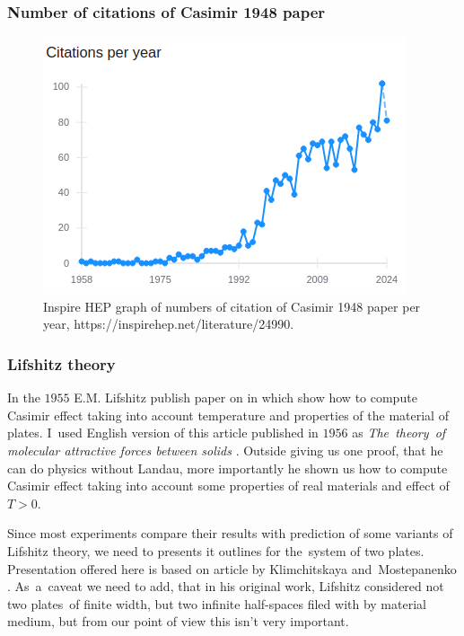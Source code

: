 \documentclass[10pt,t]{beamer}
\begin{document}
\begin{frame}
  \frametitle{Number of citations of Casimir 1948 paper}


  \begin{figure}

    \label{fig:Casimir-paper-citations}

    \centering


    \includegraphics[scale=0.6]
    {./Presentation-pictures/Casimir-paper-citations.png}

    \caption{Inspire HEP graph of numbers of citation of Casimir 1948 paper
      per year, 
      {https://inspirehep.net/literature/24990}.}


  \end{figure}

\end{frame}





\begin{frame}
  \frametitle{Lifshitz theory}


  In the $1955$ E.M. Lifshitz publish paper on in which show how to compute
  Casimir effect taking into account temperature and properties of the
  material of plates. I~used English version of this article published in
  $1956$ as \textit{The~theory~of molecular attractive forces between
    solids} \parencite{Lifshitz-The-theory-of-molecular-ETC-Pub-1956}.
  Outside giving us one proof, that he can do physics without Landau, more
  importantly he shown us how to compute Casimir effect taking into
  account some properties of real materials and effect of $T > 0$.

  Since most experiments compare their results with prediction of some
  variants of Lifshitz theory, we need to presents it outlines for
  the~system of two plates. Presentation offered here is based on article
  by Klimchitskaya and~Mostepanenko
  \parencite{Klimchitskaya-Mostepanenko-Current-status-ETC-Pub-2022}.
  As~a~caveat we need to add, that in his original work, Lifshitz
  considered not two plates~of finite width, but two infinite half-spaces
  filed with by material medium, but from our point of view this isn't
  very important.

\end{frame}
\end{document}
